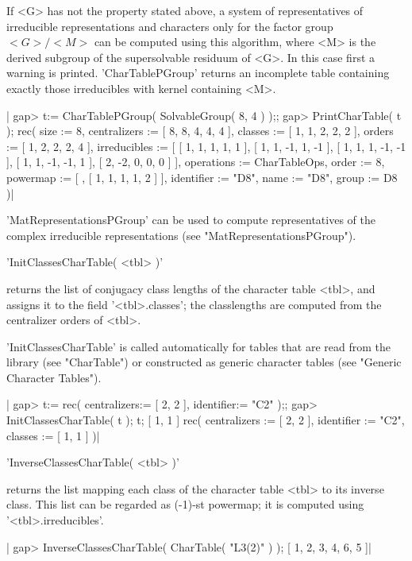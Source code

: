 If <G> has not the property stated above, a system of representatives of
irreducible representations and characters only for the factor group $<G>
/ <M>$ can be computed using this algorithm, where <M> is the derived
subgroup of the supersolvable residuum of <G>.  In this case first a
warning is printed.  'CharTablePGroup' returns an incomplete table
containing exactly those irreducibles with kernel containing <M>.

|    gap> t:= CharTablePGroup( SolvableGroup( 8, 4 ) );;
    gap> PrintCharTable( t );
    rec( size := 8, centralizers := [ 8, 8, 4, 4, 4 ], classes :=
    [ 1, 1, 2, 2, 2 ], orders := [ 1, 2, 2, 2, 4 ], irreducibles :=
    [ [ 1, 1, 1, 1, 1 ], [ 1, 1, -1, 1, -1 ], [ 1, 1, 1, -1, -1 ],
      [ 1, 1, -1, -1, 1 ], [ 2, -2, 0, 0, 0 ]
     ], operations := CharTableOps, order := 8, powermap :=
    [ , [ 1, 1, 1, 1, 2 ]
     ], identifier := "D8", name := "D8", group := D8 )|

'MatRepresentationsPGroup' can be used to compute representatives of
the complex irreducible representations (see "MatRepresentationsPGroup").

%

'InitClassesCharTable( <tbl> )'

returns the list of conjugacy class lengths of the character table <tbl>,
and assigns it to the field '<tbl>.classes'; the classlengths are
computed from the centralizer orders of <tbl>.

'InitClassesCharTable' is called automatically for tables that are read
from the library (see "CharTable") or constructed as generic character
tables (see "Generic Character Tables").

|    gap> t:= rec( centralizers:= [ 2, 2 ], identifier:= "C2" );;
    gap> InitClassesCharTable( t ); t;
    [ 1, 1 ]
    rec(
      centralizers := [ 2, 2 ],
      identifier := "C2",
      classes := [ 1, 1 ] )|


'InverseClassesCharTable( <tbl> )'

returns the list mapping each class of the character table <tbl> to its
inverse class. This list can be regarded as (-1)-st powermap; it is
computed using '<tbl>.irreducibles'.


|    gap> InverseClassesCharTable( CharTable( "L3(2)" ) );
    [ 1, 2, 3, 4, 6, 5 ]|

